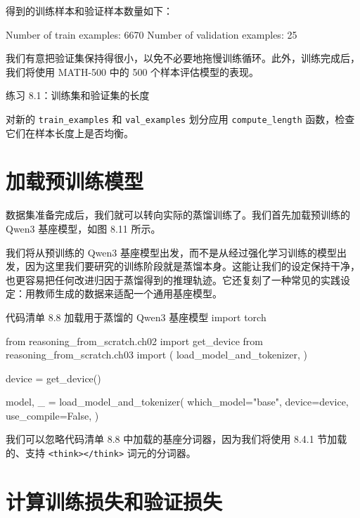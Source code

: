 得到的训练样本和验证样本数量如下：

\begin{codebox}
Number of train examples: 6670
Number of validation examples: 25
\end{codebox}

我们有意把验证集保持得很小，以免不必要地拖慢训练循环。此外，训练完成后，我们将使用 MATH-500 中的 500 个样本评估模型的表现。

\begin{mySidebar}{练习 8.1：训练集和验证集的长度}

对新的 \texttt{train\_examples} 和 \texttt{val\_examples} 划分应用 \texttt{compute\_length} 函数，检查它们在样本长度上是否均衡。

\end{mySidebar}

\section{加载预训练模型}

数据集准备完成后，我们就可以转向实际的蒸馏训练了。我们首先加载预训练的 Qwen3 基座模型，如图 8.11 所示。


我们将从预训练的 Qwen3 基座模型出发，而不是从经过强化学习训练的模型出发，因为这里我们要研究的训练阶段就是蒸馏本身。这能让我们的设定保持干净，也更容易把任何改进归因于蒸馏得到的推理轨迹。它还复刻了一种常见的实践设定：用教师生成的数据来适配一个通用基座模型。

\begin{codeboxt}{代码清单 8.8 加载用于蒸馏的 Qwen3 基座模型}
import torch

from reasoning_from_scratch.ch02 import get_device
from reasoning_from_scratch.ch03 import (
    load_model_and_tokenizer,
)

device = get_device()

model, _ = load_model_and_tokenizer(
    which_model="base",
    device=device,
    use_compile=False,
)
\end{codeboxt}

我们可以忽略代码清单 8.8 中加载的基座分词器，因为我们将使用 8.4.1 节加载的、支持 \texttt{\textless{}think\textgreater{}\textless{}/think\textgreater{}} 词元的分词器。

\section{计算训练损失和验证损失}

